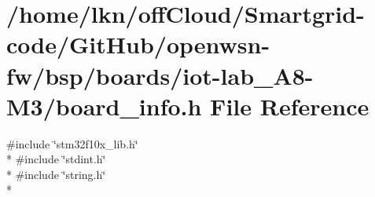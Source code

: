 \hypertarget{iot-lab___a8-_m3_2board__info_8h}{}\section{/home/lkn/off\+Cloud/\+Smartgrid-\/code/\+Git\+Hub/openwsn-\/fw/bsp/boards/iot-\/lab\+\_\+\+A8-\/\+M3/board\+\_\+info.h File Reference}
\label{iot-lab___a8-_m3_2board__info_8h}
{\ttfamily \#include \char`\"{}stm32f10x\+\_\+lib.\+h\char`\"{}}\\*
{\ttfamily \#include \char`\"{}stdint.\+h\char`\"{}}\\*
{\ttfamily \#include \char`\"{}string.\+h\char`\"{}}\\*
